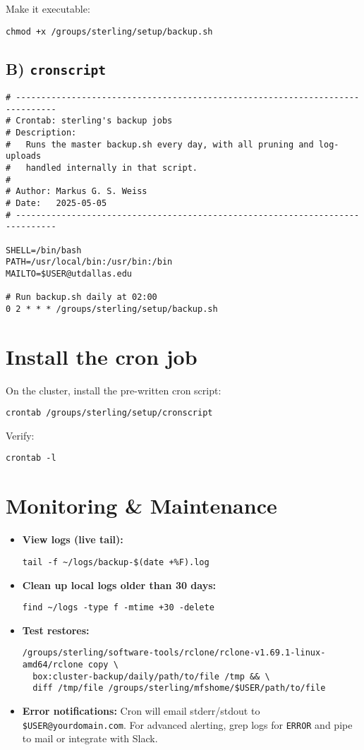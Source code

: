 \documentclass[12pt,letterpaper]{article}
\begin{document}
Make it executable:
\begin{lstlisting}[style=custombash]
chmod +x /groups/sterling/setup/backup.sh
\end{lstlisting}

\subsection{B) \texttt{cronscript}}
\begin{lstlisting}[style=custombash]
# ------------------------------------------------------------------------------
# Crontab: sterling's backup jobs
# Description:
#   Runs the master backup.sh every day, with all pruning and log-uploads
#   handled internally in that script.
#
# Author: Markus G. S. Weiss
# Date:   2025-05-05
# ------------------------------------------------------------------------------

SHELL=/bin/bash
PATH=/usr/local/bin:/usr/bin:/bin
MAILTO=$USER@utdallas.edu

# Run backup.sh daily at 02:00
0 2 * * * /groups/sterling/setup/backup.sh
\end{lstlisting}

\section{Install the cron job}
\label{sec:install-cron}
On the cluster, install the pre-written cron script:
\begin{lstlisting}[style=custombash]
crontab /groups/sterling/setup/cronscript
\end{lstlisting}
Verify:
\begin{lstlisting}[style=custombash]
crontab -l
\end{lstlisting}

\section{Monitoring \& Maintenance}
\begin{itemize}
  \item \textbf{View logs (live tail):}
    \begin{lstlisting}[style=custombash]
tail -f ~/logs/backup-$(date +%F).log
    \end{lstlisting}
  \item \textbf{Clean up local logs older than 30 days:}
    \begin{lstlisting}[style=custombash]
find ~/logs -type f -mtime +30 -delete
    \end{lstlisting}
  \item \textbf{Test restores:}
    \begin{lstlisting}[style=custombash]
/groups/sterling/software-tools/rclone/rclone-v1.69.1-linux-amd64/rclone copy \
  box:cluster-backup/daily/path/to/file /tmp && \
  diff /tmp/file /groups/sterling/mfshome/$USER/path/to/file
    \end{lstlisting}
  \item \textbf{Error notifications:} Cron will email stderr/stdout to \verb|$USER@yourdomain.com|. For advanced alerting, grep logs for \texttt{ERROR} and pipe to mail or integrate with Slack.
\end{itemize}
\end{document}

